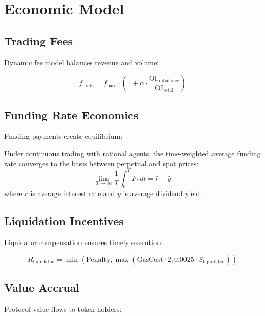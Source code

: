 \section{Economic Model}


\subsection{Trading Fees}

Dynamic fee model balances revenue and volume:

\begin{equation}
f_{\text{trade}} = f_{\text{base}} \cdot \left(1 + \alpha \cdot \frac{\text{OI}_{\text{imbalance}}}{\text{OI}_{\text{total}}}\right)
\end{equation}

\subsection{Funding Rate Economics}

Funding payments create equilibrium:

\begin{theorem}
Under continuous trading with rational agents, the time-weighted average funding rate converges to the basis between perpetual and spot prices:
\begin{equation}
\lim_{T \to \infty} \frac{1}{T} \int_0^T F_t \, dt = \bar{r} - \bar{y}
\end{equation}
where $\bar{r}$ is average interest rate and $\bar{y}$ is average dividend yield.
\end{theorem}

\subsection{Liquidation Incentives}

Liquidator compensation ensures timely execution:

\begin{equation}
R_{\text{liquidator}} = \min\left(\text{Penalty}, \max\left(\text{GasCost} \cdot 2, 0.0025 \cdot S_{\text{liquidated}}\right)\right)
\end{equation}

\subsection{Value Accrual}

Protocol value flows to token holders:

